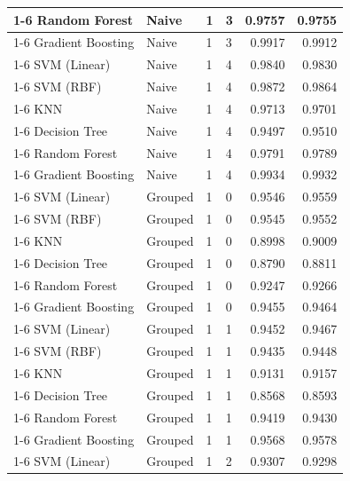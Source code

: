 \begin{table}
\begin{tabular}{llllrr}
\cline{1-6} \cline{2-6} \cline{3-6}
Random Forest & Naive & 1 & 3 & 0.9757 & 0.9755 \\
\cline{1-6} \cline{2-6} \cline{3-6}
Gradient Boosting & Naive & 1 & 3 & 0.9917 & 0.9912 \\
\cline{1-6} \cline{2-6} \cline{3-6}
SVM (Linear) & Naive & 1 & 4 & 0.9840 & 0.9830 \\
\cline{1-6} \cline{2-6} \cline{3-6}
SVM (RBF) & Naive & 1 & 4 & 0.9872 & 0.9864 \\
\cline{1-6} \cline{2-6} \cline{3-6}
KNN & Naive & 1 & 4 & 0.9713 & 0.9701 \\
\cline{1-6} \cline{2-6} \cline{3-6}
Decision Tree & Naive & 1 & 4 & 0.9497 & 0.9510 \\
\cline{1-6} \cline{2-6} \cline{3-6}
Random Forest & Naive & 1 & 4 & 0.9791 & 0.9789 \\
\cline{1-6} \cline{2-6} \cline{3-6}
Gradient Boosting & Naive & 1 & 4 & 0.9934 & 0.9932 \\
\cline{1-6} \cline{2-6} \cline{3-6}
SVM (Linear) & Grouped & 1 & 0 & 0.9546 & 0.9559 \\
\cline{1-6} \cline{2-6} \cline{3-6}
SVM (RBF) & Grouped & 1 & 0 & 0.9545 & 0.9552 \\
\cline{1-6} \cline{2-6} \cline{3-6}
KNN & Grouped & 1 & 0 & 0.8998 & 0.9009 \\
\cline{1-6} \cline{2-6} \cline{3-6}
Decision Tree & Grouped & 1 & 0 & 0.8790 & 0.8811 \\
\cline{1-6} \cline{2-6} \cline{3-6}
Random Forest & Grouped & 1 & 0 & 0.9247 & 0.9266 \\
\cline{1-6} \cline{2-6} \cline{3-6}
Gradient Boosting & Grouped & 1 & 0 & 0.9455 & 0.9464 \\
\cline{1-6} \cline{2-6} \cline{3-6}
SVM (Linear) & Grouped & 1 & 1 & 0.9452 & 0.9467 \\
\cline{1-6} \cline{2-6} \cline{3-6}
SVM (RBF) & Grouped & 1 & 1 & 0.9435 & 0.9448 \\
\cline{1-6} \cline{2-6} \cline{3-6}
KNN & Grouped & 1 & 1 & 0.9131 & 0.9157 \\
\cline{1-6} \cline{2-6} \cline{3-6}
Decision Tree & Grouped & 1 & 1 & 0.8568 & 0.8593 \\
\cline{1-6} \cline{2-6} \cline{3-6}
Random Forest & Grouped & 1 & 1 & 0.9419 & 0.9430 \\
\cline{1-6} \cline{2-6} \cline{3-6}
Gradient Boosting & Grouped & 1 & 1 & 0.9568 & 0.9578 \\
\cline{1-6} \cline{2-6} \cline{3-6}
SVM (Linear) & Grouped & 1 & 2 & 0.9307 & 0.9298 \\

\end{tabular}
\end{table}
